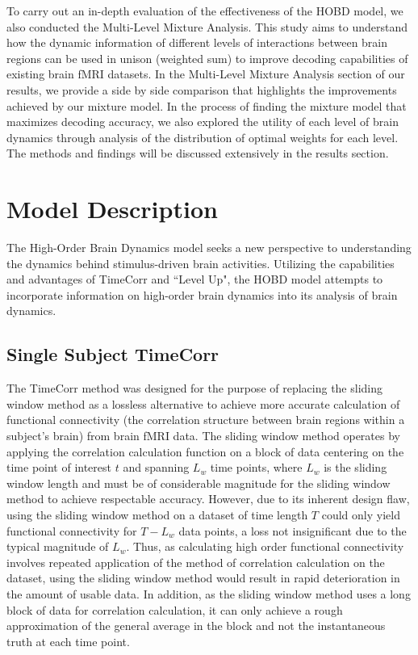 \documentclass[11pt]{article}
\begin{document}
To carry out an in-depth evaluation of the effectiveness of the HOBD model, we also conducted the Multi-Level Mixture Analysis. This study aims to understand how the dynamic information of different levels of interactions between brain regions can be used in unison (weighted sum) to improve decoding capabilities of existing brain fMRI datasets. In the Multi-Level Mixture Analysis section of our results, we provide a side by side comparison that highlights the improvements achieved by our mixture model. In the process of finding the mixture model that maximizes decoding accuracy, we also explored the utility of each level of brain dynamics through analysis of the distribution of optimal weights for each level. The methods and findings will be discussed extensively in the results section.

\newpage
\section{Model Description}
The High-Order Brain Dynamics model seeks a new perspective to understanding the dynamics behind stimulus-driven brain activities. Utilizing the capabilities and advantages of TimeCorr and ``Level Up", the HOBD model attempts to incorporate information on high-order brain dynamics into its analysis of brain dynamics.

\subsection{Single Subject TimeCorr}
The TimeCorr method was designed for the purpose of replacing the sliding window method as a lossless alternative to achieve more accurate calculation of functional connectivity (the correlation structure between brain regions within a subject's brain) from brain fMRI data. The sliding window method operates by applying the correlation calculation function on a block of data centering on the time point of interest $t$ and spanning $L_w$ time points, where $L_w$ is the sliding window length and must be of considerable magnitude for the sliding window method to achieve respectable accuracy. However, due to its inherent design flaw, using the sliding window method on a dataset of time length $T$ could only yield functional connectivity for $T-L_w$ data points, a loss not insignificant due to the typical magnitude of $L_w$. Thus, as calculating high order functional connectivity involves repeated application of the method of correlation calculation on the dataset, using the sliding window method would result in rapid deterioration in the amount of usable data. In addition, as the sliding window method uses a long block of data for correlation calculation, it can only achieve a rough approximation of the general average in the block and not the instantaneous truth at each time point.
\end{document}

